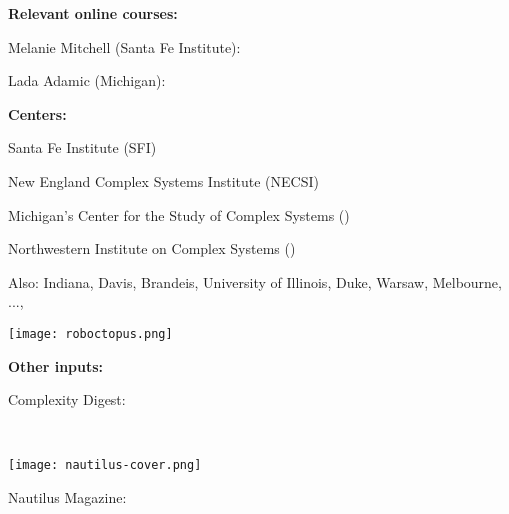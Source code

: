 \begin{frame}[plain]
  \medskip
  \medskip


  \textbf{Relevant online courses:}

  
   
    Melanie Mitchell (Santa Fe Institute): \\
     
    Lada Adamic (Michigan): \\
  


  \textbf{Centers:}

  
  
   
    Santa Fe Institute (SFI)
   
    New England Complex Systems Institute (NECSI)
   
    Michigan's Center for the Study of Complex Systems 
    () 
   
    Northwestern Institute on Complex Systems 
    ()
   
    Also: Indiana, Davis, Brandeis, University of Illinois, Duke, Warsaw, Melbourne, ..., 
  
    \texttt{[image: roboctopus.png]}
  
  



  \textbf{Other inputs:}

  
    
    
      Complexity Digest:
      
      {\small
        \\
      }
    
          
      
      \texttt{[image: nautilus-cover.png]}
      
      
       
        Nautilus Magazine: 
      
      





\end{frame}
